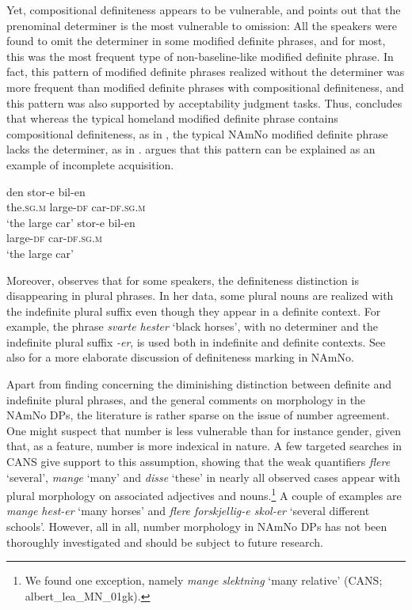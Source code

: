 \documentclass[output=paper]{langscibook}
\begin{document}
Yet, compositional definiteness appears to be vulnerable, and \citet{vanBaal2020} points out that the prenominal determiner is the most vulnerable to omission: All the speakers were found to omit the determiner in some modified definite phrases, and for most, this was the most frequent type of non\hyp baseline\hyp like modified definite phrase. In fact, this pattern of modified definite phrases realized without the determiner was more frequent than modified definite phrases with compositional definiteness, and this pattern was also supported by acceptability judgment tasks. Thus, \citet[218]{vanBaal2020} concludes that whereas the typical homeland modified definite phrase contains compositional definiteness, as in , the typical NAmNo modified definite phrase lacks the determiner, as in .  argues that this pattern can be explained as an example of incomplete acquisition. 


\ea \label{ex:riksem:4}
\ea \label{ex:riksem:4a}
	\gll den stor-e bil-en\\
		 the\textsc{.sg.m} large-\textsc{df} car-\textsc{df.sg.m}\\
	\glt ‘the large car’
\ex \label{ex:riksem:4b}
	\gll stor-e bil-en\\
		 large-\textsc{df} car-\textsc{df.sg.m}\\
	\glt ‘the large car’
\z
\z



Moreover, \citet{vanBaal2020} observes that for some speakers, the definiteness distinction is disappearing in plural phrases. In her data, some plural nouns are realized with the indefinite plural suffix even though they appear in a definite context. For example, the phrase \textit{svarte hester} ‘black horses’, with no determiner and the indefinite plural suffix \textit{{}-er}, is used both in indefinite and definite contexts. See also  for a more elaborate discussion of definiteness marking in NAmNo. 



Apart from  finding concerning the diminishing distinction between definite and indefinite plural phrases, and the general comments on morphology in the NAmNo DPs, the literature is rather sparse on the issue of number agreement. One might suspect that number is less vulnerable than for instance gender, given that, as a feature, number is more indexical in nature. A few targeted searches in CANS give support to this assumption, showing that the weak quantifiers \textit{flere} ‘several’, \textit{mange} ‘many’ and \textit{disse} ‘these’ in nearly all observed cases appear with plural morphology on associated adjectives and nouns.\footnote{\textrm{We found one exception, namely} \textrm{\textit{mange slektning} }\textrm{‘many relative’ (CANS;} %
albert\_lea\_MN\_01gk).}
A couple of examples are \textit{mange hest-er} ‘many horses\textsc{’} and \textit{flere forskjellig-e skol-er} ‘several different schools’. However, all in all, number morphology in NAmNo DPs has not been thoroughly investigated and should be subject to future research. 
\end{document}

